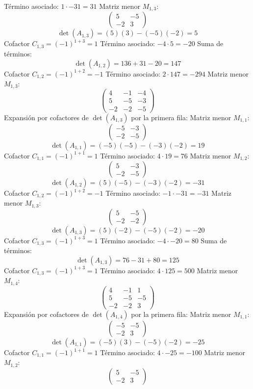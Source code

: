 \documentclass{article}
\begin{document}
Término asociado: $ 1 \cdot -31 = 31 $
Matriz menor $M_{1,3}$:
\[\begin{pmatrix}5 & -5 \\ -2 & 3\end{pmatrix}\]
\[\det(A_{1,3}) = (5)(3) - (-5)(-2) = 5\]
Cofactor $C_{1,3} = (-1)^{1+3} = 1$
Término asociado: $ -4 \cdot 5 = -20 $
Suma de términos:
\[\det(A_{1,2}) = 136 + 31 - 20 = 147\]
Cofactor $C_{1,2} = (-1)^{1+2} = -1$
Término asociado: $ 2 \cdot 147 = -294 $
Matriz menor $M_{1,3}$:
\[\begin{pmatrix}4 & -1 & -4 \\ 5 & -5 & -3 \\ -2 & -2 & -5\end{pmatrix}\]
Expansión por cofactores de $\det(A_{1,3})$ por la primera fila:
Matriz menor $M_{1,1}$:
\[\begin{pmatrix}-5 & -3 \\ -2 & -5\end{pmatrix}\]
\[\det(A_{1,1}) = (-5)(-5) - (-3)(-2) = 19\]
Cofactor $C_{1,1} = (-1)^{1+1} = 1$
Término asociado: $ 4 \cdot 19 = 76 $
Matriz menor $M_{1,2}$:
\[\begin{pmatrix}5 & -3 \\ -2 & -5\end{pmatrix}\]
\[\det(A_{1,2}) = (5)(-5) - (-3)(-2) = -31\]
Cofactor $C_{1,2} = (-1)^{1+2} = -1$
Término asociado: $ -1 \cdot -31 = -31 $
Matriz menor $M_{1,3}$:
\[\begin{pmatrix}5 & -5 \\ -2 & -2\end{pmatrix}\]
\[\det(A_{1,3}) = (5)(-2) - (-5)(-2) = -20\]
Cofactor $C_{1,3} = (-1)^{1+3} = 1$
Término asociado: $ -4 \cdot -20 = 80 $
Suma de términos:
\[\det(A_{1,3}) = 76 - 31 + 80 = 125\]
Cofactor $C_{1,3} = (-1)^{1+3} = 1$
Término asociado: $ 4 \cdot 125 = 500 $
Matriz menor $M_{1,4}$:
\[\begin{pmatrix}4 & -1 & 1 \\ 5 & -5 & -5 \\ -2 & -2 & 3\end{pmatrix}\]
Expansión por cofactores de $\det(A_{1,4})$ por la primera fila:
Matriz menor $M_{1,1}$:
\[\begin{pmatrix}-5 & -5 \\ -2 & 3\end{pmatrix}\]
\[\det(A_{1,1}) = (-5)(3) - (-5)(-2) = -25\]
Cofactor $C_{1,1} = (-1)^{1+1} = 1$
Término asociado: $ 4 \cdot -25 = -100 $
Matriz menor $M_{1,2}$:
\[\begin{pmatrix}5 & -5 \\ -2 & 3\end{pmatrix}\]
\end{document}
